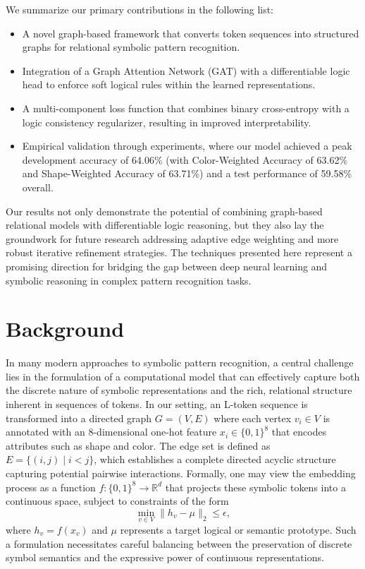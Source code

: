 \documentclass{article}
\begin{document}
We summarize our primary contributions in the following list:
\begin{itemize}
    \item A novel graph-based framework that converts token sequences into structured graphs for relational symbolic pattern recognition.
    \item Integration of a Graph Attention Network (GAT) with a differentiable logic head to enforce soft logical rules within the learned representations.
    \item A multi-component loss function that combines binary cross-entropy with a logic consistency regularizer, resulting in improved interpretability.
    \item Empirical validation through experiments, where our model achieved a peak development accuracy of 64.06\% (with Color-Weighted Accuracy of 63.62\% and Shape-Weighted Accuracy of 63.71\%) and a test performance of 59.58\% overall.
\end{itemize}
Our results not only demonstrate the potential of combining graph-based relational models with differentiable logic reasoning, but they also lay the groundwork for future research addressing adaptive edge weighting and more robust iterative refinement strategies. The techniques presented here represent a promising direction for bridging the gap between deep neural learning and symbolic reasoning in complex pattern recognition tasks.

\section{Background}
In many modern approaches to symbolic pattern recognition, a central challenge lies in the formulation of a computational model that can effectively capture both the discrete nature of symbolic representations and the rich, relational structure inherent in sequences of tokens. In our setting, an L-token sequence is transformed into a directed graph \(G = (V, E)\) where each vertex \(v_i \in V\) is annotated with an 8-dimensional one-hot feature \(x_i \in \{0,1\}^8\) that encodes attributes such as shape and color. The edge set is defined as \(E = \{(i,j) \mid i < j\}\), which establishes a complete directed acyclic structure capturing potential pairwise interactions. Formally, one may view the embedding process as a function \(f: \{0,1\}^8 \rightarrow \mathbb{R}^d\) that projects these symbolic tokens into a continuous space, subject to constraints of the form 
\[
\min_{v \in V} \|h_v - \mu\|_2 \leq \epsilon,
\]
where \(h_v = f(x_v)\) and \(\mu\) represents a target logical or semantic prototype. Such a formulation necessitates careful balancing between the preservation of discrete symbol semantics and the expressive power of continuous representations.
\end{document}
